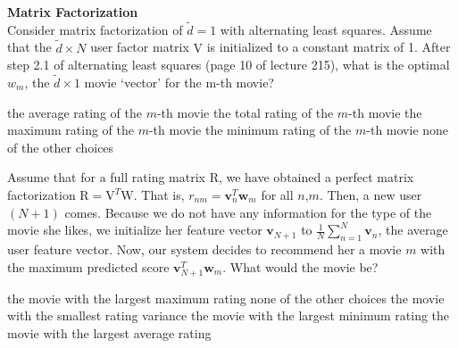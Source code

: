 \documentclass[a4paper,10pt]{exam}
\begin{document}
\begin{questions}
	   \question \textbf{Matrix Factorization}\\
	   Consider matrix factorization of $\tilde{d} = 1$ with alternating least squares. Assume that the $\tilde{d} \times N$ user factor matrix $\mathrm{V}$ is initialized to a constant matrix of 1. After step 2.1 of alternating least squares (page 10 of lecture 215), what is the optimal $w_m$, the $\tilde{d} \times 1$ movie `vector' for the m-th movie?
	   \begin{checkboxes}
	   	\CorrectChoice the average rating of the $m$-th movie
	   	\choice the total rating of the $m$-th movie
	   	\choice the maximum rating of the $m$-th movie
	   	\choice the minimum rating of the $m$-th movie
	   	\choice none of the other choices\\
	   \end{checkboxes}
	   
	   \question Assume that for a full rating matrix $\mathrm{R}$, we have obtained a perfect matrix factorization $\mathrm{R} = \mathrm{V}^T \mathrm{W}$. That is, $r_{nm} = \mathbf{v}_n^T \mathbf{w}_m$ for all $n$,$m$. Then, a new user $(N+1)$ comes. Because we do not have any information for the type of the movie she likes, we initialize her feature vector $\mathbf{v}_{N+1}$ to $\frac{1}{N} \sum_{n    =1}^N \mathbf{v}_n$, the average user feature vector. Now, our system decides to recommend her a movie $m$ with the maximum predicted score $\mathbf{v}_{N+1}^T \mathbf{w}_m$. What would the movie be?
	   \begin{checkboxes}
	   	\choice the movie with the largest maximum rating
	   	\choice none of the other choices
	   	\choice the movie with the smallest rating variance
	   	\choice the movie with the largest minimum rating
	   	\CorrectChoice the movie with the largest average rating\\
	   \end{checkboxes}
	   

\end{questions}
\end{document}
